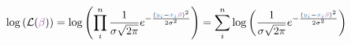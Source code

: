 \documentclass[convert={density=400,outext=.png}]{standalone}
\begin{document}
\pagecolor{almost-white}


$\displaystyle
\log \left(\mathcal{L}({\color[HTML]{984EA3}\beta}) \right) = \log \left(\prod_i^n\frac{1}{\sigma \sqrt{2\pi}} e^{-\frac{({\color[HTML]{377EB8}y_i} - {\color[HTML]{377EB8}x_i}{\color[HTML]{984EA3}\beta})^2}{2\sigma^2}} \right) = \sum_i^n\log \left(\frac{1}{\sigma \sqrt{2\pi}} e^{-\frac{({\color[HTML]{377EB8}y_i} - {\color[HTML]{377EB8}x_i}{\color[HTML]{984EA3}\beta})^2}{2\sigma^2}}\right) 
$
\end{document}
